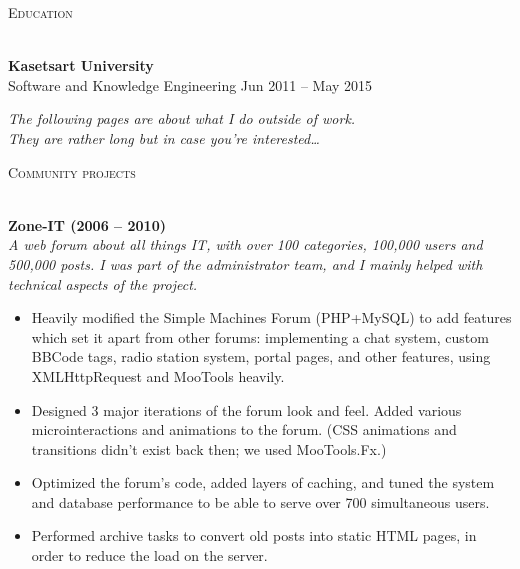 \documentclass[a4paper]{article}
\newcommand{\lineunder} {
    \vspace*{-8pt} \\
    \hspace*{-18pt} \hrulefill \\
}
\newcommand{\header} [1] {
    {\hspace*{-18pt}\vspace*{6pt} \textsc{#1}}
    \vspace*{-6pt} \lineunder
}
\begin{document}
\header{Education}
\vspace{1mm}

\textbf{Kasetsart University}\\
Software and Knowledge Engineering \hfill Jun 2011 – May 2015\\
\vspace{2mm}



\newpage

\begin{center}
    \textit{The following pages are about what I do outside of work. \\ They are rather long but in case you’re interested…}
\end{center}
\vspace{3mm}






\header{Community projects}
\vspace{1mm}

\textbf{Zone-IT (2006 – 2010)}\\
\textit{A web forum about all things IT, with over 100 categories, 100,000 users and 500,000 posts. I was part of the administrator team, and I mainly helped with technical aspects of the project.}

\begin{itemize} \itemsep 1pt
    
	\item Heavily modified the Simple Machines Forum (PHP+MySQL) to add features which set it apart from other forums: implementing a chat system, custom BBCode tags, radio station system, portal pages, and other features, using XMLHttpRequest and MooTools heavily.
    
	\item Designed 3 major iterations of the forum look and feel. Added various microinteractions and animations to the forum. (CSS animations and transitions didn’t exist back then; we used MooTools.Fx.)
    
	\item Optimized the forum’s code, added layers of caching, and tuned the system and database performance to be able to serve over 700 simultaneous users.
    
	\item Performed archive tasks to convert old posts into static HTML pages, in order to reduce the load on the server.
    
\end{itemize}
\end{document}
